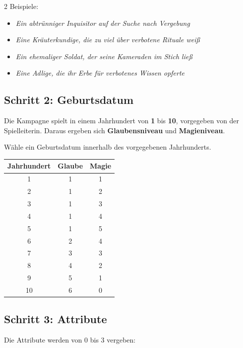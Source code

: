 \begin{multicols*}{2}
Beispiele:
\begin{itemize}[leftmargin=*]
\item \textit{Ein abtrünniger Inquisitor auf der Suche nach Vergebung}
\item \textit{Eine Kräuterkundige, die zu viel über verbotene Rituale weiß}
\item \textit{Ein ehemaliger Soldat, der seine Kameraden im Stich ließ}
\item \textit{Eine Adlige, die ihr Erbe für verbotenes Wissen opferte}
\end{itemize}

\subsection{Schritt 2: Geburtsdatum}\label{subsec:schritt-2:-geburtsdatum}

Die Kampagne spielt in einem Jahrhundert von \textbf{1} bis \textbf{10}, vorgegeben von der Spielleiterin.
Daraus ergeben sich \textbf{Glaubensniveau} und \textbf{Magieniveau}.

Wähle ein Geburtsdatum innerhalb des vorgegebenen Jahrhunderts.

\begin{center}
\begin{tabular}{ccc}
\toprule
\textbf{Jahrhundert} & \textbf{Glaube} & \textbf{Magie} \\
\midrule
1 & 1 & 1 \\
2 & 1 & 2 \\
3 & 1 & 3 \\
4 & 1 & 4 \\
5 & 1 & 5 \\
6 & 2 & 4 \\
7 & 3 & 3 \\
8 & 4 & 2 \\
9 & 5 & 1 \\
10 & 6 & 0 \\
\bottomrule
\end{tabular}
\end{center}

\subsection{Schritt 3: Attribute}\label{subsec:schritt-3:-attribute}

Die Attribute werden von 0 bis 3 vergeben:


\end{multicols*}
